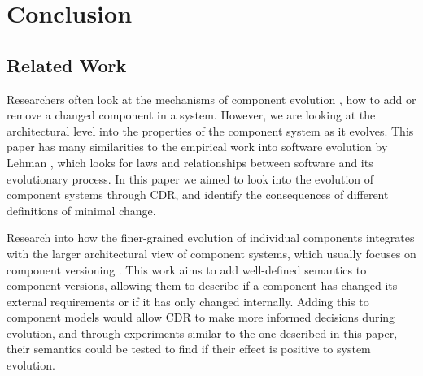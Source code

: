 \chapter{Conclusion}
\label{conclusion}













\section{Related Work}
Researchers often look at the mechanisms of component evolution \cite{Wang2006}, how to add or remove a changed component in a system.  
However, we are looking at the architectural level into the properties of the component system as it evolves.
This paper has many similarities to the empirical work into software evolution by Lehman \cite{lehman1980},
which looks for laws and relationships between software and its evolutionary process.
In this paper we aimed to look into the evolution of component systems through CDR,
and identify the consequences of different definitions of minimal change. 

Research into how the finer-grained evolution of individual components integrates with the larger architectural view of component systems, which
usually focuses on component versioning \cite{Bauml2009,Stuckenholz2005}.
This work aims to add well-defined semantics to component versions, 
allowing them to describe if a component has changed its external requirements or if it has only changed internally.
Adding this to component models would allow CDR to make more informed decisions during evolution, 
and through experiments similar to the one described in this paper,
their semantics could be tested to find if their effect is positive to system evolution.

